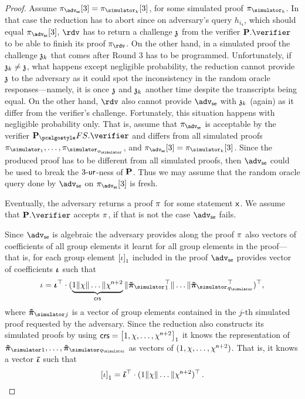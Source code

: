 \documentclass[runningheads,11pt]{llncs}
\let\spvec\vec
\let\vec\accentvec
\let\vec\spvec
\def\vec#1{\mathchoice{\mbox{\boldmath$\displaystyle#1$}}
	{\mbox{\boldmath$\textstyle#1$}}
	{\mbox{\boldmath$\scriptstyle#1$}}
	{\mbox{\boldmath$\scriptscriptstyle#1$}}}
\theoremstyle{definition}
\begin{document}
\begin{proof}
	Assume $\zkproof_{\advse}[3] = \zkproof_{\simulator_k}[3]$, for some simulated proof $\zkproof_{\simulator_k}$.
	In that case the reduction has to abort since 
	on adversary's query $h_{i_4}$, which should equal $\zkproof_{\advse}[3]$, $\rdv$ has to return a challenge $\mathfrak{z}$ from the verifier $\plonkprot.\verifier$ to be able to finish its proof $\zkproof_\rdv$. 
	On the other hand, in a simulated proof the challenge $\mathfrak{z}_k$ that comes after Round 3 has to be programmed. 
	Unfortunately, if $\mathfrak{z}_k \neq \mathfrak{z}$, what happens except negligible probability, the reduction cannot provide $\mathfrak{z}$ to the adversary as it could spot the inconsistency in the random oracle responses---namely, it is once $\mathfrak{z}$ and $\mathfrak{z}_k$ another time despite the transcripts being equal. On the other hand, $\rdv$ also cannot provide $\advse$ with $\mathfrak{z}_k$ (again) as it differ from the verifier's challenge.
	Fortunately, this situation happens with negligible probability only. 
	That is, assume that $\zkproof_{\advse}$ is acceptable by the verifier $\plonkprotfs.\verifier$ and differs from all simulated proofs $\zkproof_{\simulator_1}, \ldots, \zkproof_{\simulator_{q_\simulator}}$, 
	and $\zkproof_{\advse}[3] =\zkproof_{\simulator_k}[3]$. 
	Since the produced proof has to be different from all simulated proofs, then $\advse$ could be used to break the ${3\text{-}\mathsf{ur}}$-ness of $\mathbf{P}$.
	Thus we may assume that the random oracle query done by $\advse$ on $\zkproof_{\advse}[3]$ is fresh.

	Eventually, the adversary returns a proof $\pi$ for some statement $\mathsf{x}$. We assume that $\plonkprot.\verifier$ accepts $\pi$, if that is not the case $\advse$ fails.
	
	Since $\advse$ is algebraic the adversary provides along the proof $\pi$ also vectors of coefficients of all group elements it learnt for all group elements in the proof---that is, for each group element $\left[\iota\right]_{1}$ included in the proof $\advse$ provides vector of coefficients $\vec{\iota}$ such that
	\[
		\iota = \vec{\iota}^\top \cdot (\underbrace{1 \| \chi \| \ldots \| \chi^{\numberofconstrains + 2}}_{\crs} \| \vec{\tilde{\zkproof}_\simulator}_1^{\top} \| \ldots \| \vec{\tilde{\zkproof}_\simulator}_{q_\simulator}^\top)^\top,
	\]
	where $\vec{\tilde{\zkproof}_\simulator}_{j}$ is a vector of group elements contained in the $j$-th simulated proof requested by the adversary.
	Since the reduction also constructs its simulated proofs by using $\mathsf{crs} = \left[1, \chi, \ldots, \chi^{\mathsf{n} + 2}\right]_{1}$ it knows the representation of $\vec{\tilde{\zkproof}_\simulator}_1, \ldots, \vec{\tilde{\zkproof}_\simulator}_{q_\simulator}$ as vectors of $(1, \chi, \ldots, \chi^{\mathsf{n} + 2})$. 
	That is, it knows a vector $\vec{\tilde{\iota}}$ such that
	\[
		\gone{\iota} = \vec{\tilde{\iota}}^\top \cdot (1 \| \chi \| \ldots \| \chi^{\numberofconstrains + 2})^\top\,.
	\]
	

\end{proof}
\end{document}
